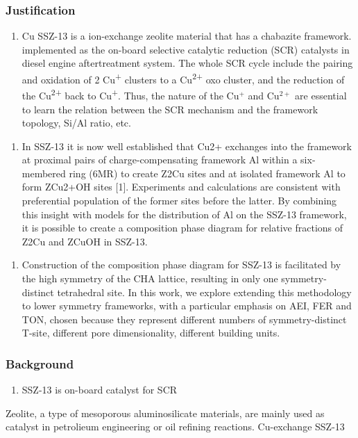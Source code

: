 \documentclass[12pt]{article}
\begin{document}
\subsubsection*{Justification}
\begin{enumerate}
\item Cu SSZ-13 is a ion-exchange zeolite material that has a chabazite framework. implemented as the on-board selective catalytic reduction (SCR) catalysts in diesel engine aftertreatment system. The whole SCR cycle include the pairing and oxidation of 2 Cu\textsuperscript{+} clusters to a Cu\textsuperscript{2+} oxo cluster, and the reduction of the Cu\textsuperscript{2+} back to Cu\textsuperscript{+}. Thus, the nature of the Cu$^{+}$ and Cu$^{2+}$ are essential to learn the relation between the SCR mechanism and the framework topology, Si/Al ratio, etc.
\end{enumerate}

\begin{enumerate}
\item In SSZ-13 it is now well established that Cu2+ exchanges into the framework at proximal pairs of charge-compensating framework Al within a six-membered ring (6MR) to create Z2Cu sites and at isolated framework Al to form ZCu2+OH sites [1]. Experiments and calculations are consistent with preferential population of the former sites before the latter. By combining this insight with models for the distribution of Al on the SSZ-13 framework, it is possible to create a composition phase diagram for relative fractions of Z2Cu and ZCuOH in SSZ-13.\cite{Paolucci2016}
\end{enumerate}

\begin{enumerate}
\item Construction of the composition phase diagram for SSZ-13 is facilitated by the high symmetry of the CHA lattice, resulting in only one symmetry-distinct tetrahedral site. In this work, we explore extending this  methodology to lower symmetry frameworks, with a particular emphasis on AEI, FER and TON, chosen because they represent different numbers of symmetry-distinct T-site, different pore dimensionality, different building units.
\end{enumerate}

\subsubsection*{Background}
\begin{enumerate}
\item SSZ-13 is on-board catalyst for SCR
\end{enumerate}
Zeolite, a type of mesoporous aluminosilicate materials, are mainly used as catalyst in petrolieum engineering or oil refining reactions. Cu-exchange SSZ-13
 
\end{document}
